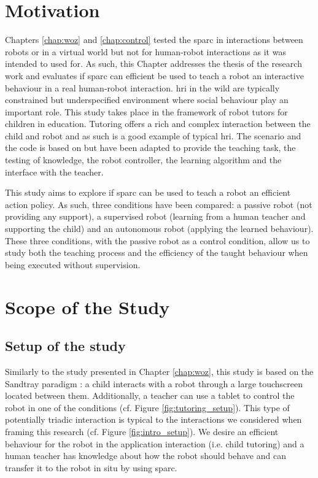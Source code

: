 \section{Motivation}

Chapters \ref{chap:woz} and \ref{chap:control} tested the \gls{sparc} in interactions between robots or in a virtual world but not for human-robot interactions as it was intended to used for. As such, this Chapter addresses the thesis of the research work and evaluates if \gls{sparc} can efficient be used to teach a robot an interactive behaviour in a real human-robot interaction. \gls{hri} in the wild are typically constrained but underspecified environment where social behaviour play an important role. This study takes place in the framework of robot tutors for children in education. Tutoring offers a rich and complex interaction between the child and robot and as such is a good example of typical \gls{hri}. The scenario and the code is based on \cite{lemaignan2017free} but have been adapted to provide the teaching task, the testing of knowledge, the robot controller, the learning algorithm and the interface with the teacher.

This study aims to explore if \gls{sparc} can be used to teach a robot an efficient action policy. As such, three conditions have been compared: a passive robot (not providing any support), a supervised robot (learning from a human teacher and supporting the child) and an autonomous robot (applying the learned behaviour). These three conditions, with the passive robot as a control condition, allow us to study both the teaching process and the efficiency of the taught behaviour when being executed without supervision.

\section{Scope of the Study}
\subsection{Setup of the study}

Similarly to the study presented in Chapter \ref{chap:woz}, this study is based on the Sandtray paradigm
\citep{baxter2012touchscreen}: a child interacts with a robot through a large touchscreen located between them.
Additionally, a teacher can use a tablet to control the robot in one of the conditions (cf. Figure
\ref{fig:tutoring_setup}). This type of potentially triadic interaction is typical to the interactions we considered when framing this research (cf. Figure \ref{fig:intro_setup}). We desire an efficient behaviour for the robot in the application interaction (i.e. child tutoring) and a human teacher has knowledge about how the robot should behave and can transfer it to the robot in situ by using \gls{sparc}.

